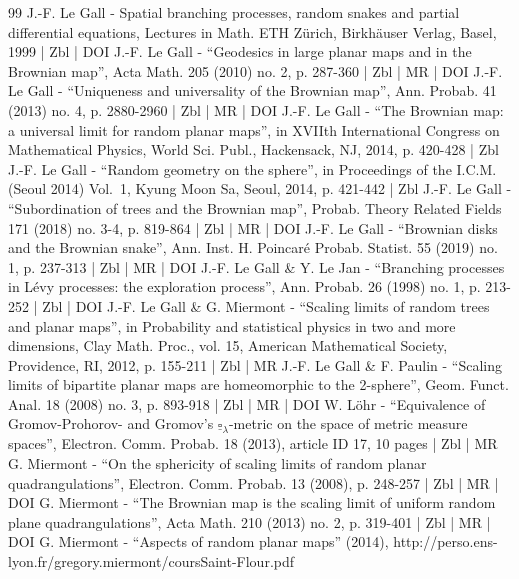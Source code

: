 \documentclass[10pt]{amsart}
\theoremstyle{plain}
\numberwithin{theorem}{section}
\theoremstyle{definition}
\begin{document}
\begin{thebibliography}{99}
J.-F. Le Gall - Spatial branching processes, random snakes and partial differential equations, Lectures in Math. ETH Zürich, Birkhäuser Verlag, Basel, 1999 | Zbl | DOI
J.-F. Le Gall - “Geodesics in large planar maps and in the Brownian map”, Acta Math. 205 (2010) no. 2, p. 287-360 | Zbl | MR | DOI
J.-F. Le Gall - “Uniqueness and universality of the Brownian map”, Ann. Probab. 41 (2013) no. 4, p. 2880-2960 | Zbl | MR | DOI
J.-F. Le Gall - “The Brownian map: a universal limit for random planar maps”, in XVIIth International Congress on Mathematical Physics, World Sci. Publ., Hackensack, NJ, 2014, p. 420-428 | Zbl
J.-F. Le Gall - “Random geometry on the sphere”, in Proceedings of the I.C.M. (Seoul 2014) Vol. 1, Kyung Moon Sa, Seoul, 2014, p. 421-442 | Zbl
J.-F. Le Gall - “Subordination of trees and the Brownian map”, Probab. Theory Related Fields 171 (2018) no. 3-4, p. 819-864 | Zbl | MR | DOI
J.-F. Le Gall - “Brownian disks and the Brownian snake”, Ann. Inst. H. Poincaré Probab. Statist. 55 (2019) no. 1, p. 237-313 | Zbl | MR | DOI
J.-F. Le Gall \& Y. Le Jan - “Branching processes in Lévy processes: the exploration process”, Ann. Probab. 26 (1998) no. 1, p. 213-252 | Zbl | DOI
J.-F. Le Gall \& G. Miermont - “Scaling limits of random trees and planar maps”, in Probability and statistical physics in two and more dimensions, Clay Math. Proc., vol. 15, American Mathematical Society, Providence, RI, 2012, p. 155-211 | Zbl | MR
J.-F. Le Gall \& F. Paulin - “Scaling limits of bipartite planar maps are homeomorphic to the 2-sphere”, Geom. Funct. Anal. 18 (2008) no. 3, p. 893-918 | Zbl | MR | DOI
W. Löhr - “Equivalence of Gromov-Prohorov- and Gromov’s $\underline{\square }_\lambda $-metric on the space of metric measure spaces”, Electron. Comm. Probab. 18 (2013), article ID 17, 10 pages | Zbl | MR
G. Miermont - “On the sphericity of scaling limits of random planar quadrangulations”, Electron. Comm. Probab. 13 (2008), p. 248-257 | Zbl | MR | DOI
G. Miermont - “The Brownian map is the scaling limit of uniform random plane quadrangulations”, Acta Math. 210 (2013) no. 2, p. 319-401 | Zbl | MR | DOI
G. Miermont - “Aspects of random planar maps” (2014), http://perso.ens-lyon.fr/gregory.miermont/coursSaint-Flour.pdf

\end{thebibliography}
\end{document}
